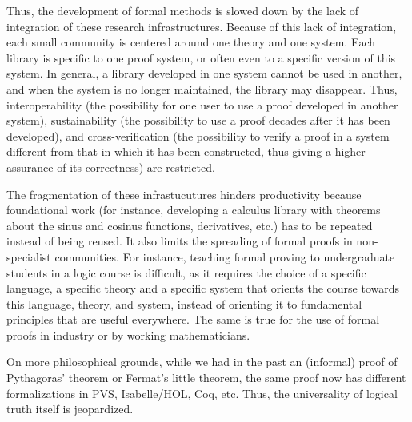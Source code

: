 Thus, the development of formal methods is slowed down by the lack of
integration of these research infrastructures.  Because of this lack
of integration, each small community is centered around one theory and
one system. Each library is specific to one proof system, or often
even to a specific version of this system. In general, a library
developed in one system cannot be used in another, and when the system
is no longer maintained, the library may disappear.  Thus,
interoperability (the possibility for one user to use a proof
developed in another system), sustainability (the possibility to use a
proof decades after it has been developed), and cross-verification
(the possibility to verify a proof in a system different from that in
which it has been constructed, thus giving a higher assurance of its
correctness) are restricted.

The fragmentation of these infrastucutures hinders productivity
because foundational work (for instance, developing a calculus library
with theorems about the sinus and cosinus functions, derivatives,
etc.) has to be repeated instead of being reused.
%
It also limits the spreading of formal proofs in non-specialist
communities. For instance, teaching formal proving to undergraduate
students in a logic course is difficult, as it requires the choice of
a specific language, a specific theory and a specific system that
orients the course towards this language, theory, and system, instead
of orienting it to fundamental principles that are useful
everywhere. The same is true for the use of formal proofs in industry
or by working mathematicians.

On more philosophical grounds, while we had in the past an (informal)
proof of Pythagoras' theorem or Fermat's little theorem, the same
proof now has different formalizations in PVS, Isabelle/HOL, Coq, etc.
Thus, the universality of logical truth itself is jeopardized.

